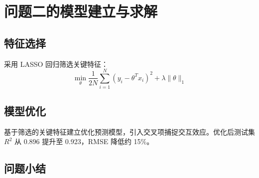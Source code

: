 \section{问题二的模型建立与求解}

\subsection{特征选择}

采用 LASSO 回归筛选关键特征：
\[
  \min_{\theta} \frac{1}{2N} \sum_{i=1}^{N} (y_i - \theta^T x_i)^2 + \lambda \|\theta\|_1
\]

\subsection{模型优化}

基于筛选的关键特征建立优化预测模型，引入交叉项捕捉交互效应。优化后测试集 $R^2$ 从 0.896 提升至 0.923，RMSE 降低约 15\%。

\subsection{问题小结}

